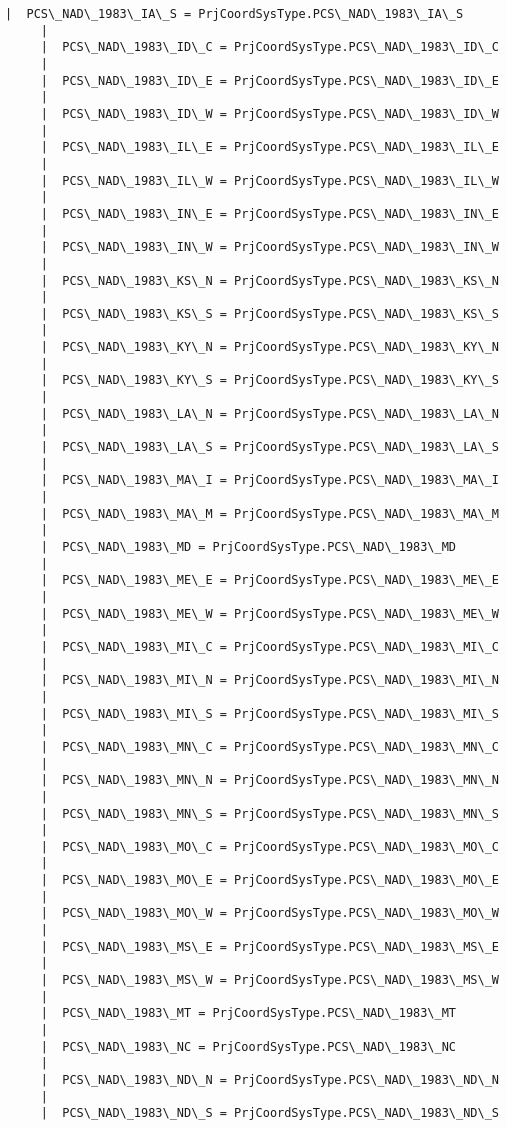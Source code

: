 \documentclass[11pt]{article}
\begin{document}
\begin{Verbatim}[commandchars=\\\{\}]
     |  PCS\_NAD\_1983\_IA\_S = PrjCoordSysType.PCS\_NAD\_1983\_IA\_S
     |  
     |  PCS\_NAD\_1983\_ID\_C = PrjCoordSysType.PCS\_NAD\_1983\_ID\_C
     |  
     |  PCS\_NAD\_1983\_ID\_E = PrjCoordSysType.PCS\_NAD\_1983\_ID\_E
     |  
     |  PCS\_NAD\_1983\_ID\_W = PrjCoordSysType.PCS\_NAD\_1983\_ID\_W
     |  
     |  PCS\_NAD\_1983\_IL\_E = PrjCoordSysType.PCS\_NAD\_1983\_IL\_E
     |  
     |  PCS\_NAD\_1983\_IL\_W = PrjCoordSysType.PCS\_NAD\_1983\_IL\_W
     |  
     |  PCS\_NAD\_1983\_IN\_E = PrjCoordSysType.PCS\_NAD\_1983\_IN\_E
     |  
     |  PCS\_NAD\_1983\_IN\_W = PrjCoordSysType.PCS\_NAD\_1983\_IN\_W
     |  
     |  PCS\_NAD\_1983\_KS\_N = PrjCoordSysType.PCS\_NAD\_1983\_KS\_N
     |  
     |  PCS\_NAD\_1983\_KS\_S = PrjCoordSysType.PCS\_NAD\_1983\_KS\_S
     |  
     |  PCS\_NAD\_1983\_KY\_N = PrjCoordSysType.PCS\_NAD\_1983\_KY\_N
     |  
     |  PCS\_NAD\_1983\_KY\_S = PrjCoordSysType.PCS\_NAD\_1983\_KY\_S
     |  
     |  PCS\_NAD\_1983\_LA\_N = PrjCoordSysType.PCS\_NAD\_1983\_LA\_N
     |  
     |  PCS\_NAD\_1983\_LA\_S = PrjCoordSysType.PCS\_NAD\_1983\_LA\_S
     |  
     |  PCS\_NAD\_1983\_MA\_I = PrjCoordSysType.PCS\_NAD\_1983\_MA\_I
     |  
     |  PCS\_NAD\_1983\_MA\_M = PrjCoordSysType.PCS\_NAD\_1983\_MA\_M
     |  
     |  PCS\_NAD\_1983\_MD = PrjCoordSysType.PCS\_NAD\_1983\_MD
     |  
     |  PCS\_NAD\_1983\_ME\_E = PrjCoordSysType.PCS\_NAD\_1983\_ME\_E
     |  
     |  PCS\_NAD\_1983\_ME\_W = PrjCoordSysType.PCS\_NAD\_1983\_ME\_W
     |  
     |  PCS\_NAD\_1983\_MI\_C = PrjCoordSysType.PCS\_NAD\_1983\_MI\_C
     |  
     |  PCS\_NAD\_1983\_MI\_N = PrjCoordSysType.PCS\_NAD\_1983\_MI\_N
     |  
     |  PCS\_NAD\_1983\_MI\_S = PrjCoordSysType.PCS\_NAD\_1983\_MI\_S
     |  
     |  PCS\_NAD\_1983\_MN\_C = PrjCoordSysType.PCS\_NAD\_1983\_MN\_C
     |  
     |  PCS\_NAD\_1983\_MN\_N = PrjCoordSysType.PCS\_NAD\_1983\_MN\_N
     |  
     |  PCS\_NAD\_1983\_MN\_S = PrjCoordSysType.PCS\_NAD\_1983\_MN\_S
     |  
     |  PCS\_NAD\_1983\_MO\_C = PrjCoordSysType.PCS\_NAD\_1983\_MO\_C
     |  
     |  PCS\_NAD\_1983\_MO\_E = PrjCoordSysType.PCS\_NAD\_1983\_MO\_E
     |  
     |  PCS\_NAD\_1983\_MO\_W = PrjCoordSysType.PCS\_NAD\_1983\_MO\_W
     |  
     |  PCS\_NAD\_1983\_MS\_E = PrjCoordSysType.PCS\_NAD\_1983\_MS\_E
     |  
     |  PCS\_NAD\_1983\_MS\_W = PrjCoordSysType.PCS\_NAD\_1983\_MS\_W
     |  
     |  PCS\_NAD\_1983\_MT = PrjCoordSysType.PCS\_NAD\_1983\_MT
     |  
     |  PCS\_NAD\_1983\_NC = PrjCoordSysType.PCS\_NAD\_1983\_NC
     |  
     |  PCS\_NAD\_1983\_ND\_N = PrjCoordSysType.PCS\_NAD\_1983\_ND\_N
     |  
     |  PCS\_NAD\_1983\_ND\_S = PrjCoordSysType.PCS\_NAD\_1983\_ND\_S

\end{Verbatim}
\end{document}
